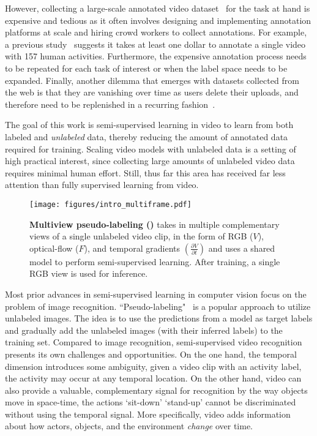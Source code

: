 \documentclass[10pt,twocolumn,letterpaper]{article}
\begin{document}
However, collecting a large-scale annotated video dataset~\cite{goyal2017something,carreira2019short} for the task at hand is expensive and tedious as it often involves designing and implementing annotation platforms at scale and hiring crowd workers to collect annotations. For example, a previous study~\cite{sigurdsson2016much} suggests it takes at least one dollar to annotate a {single} video with 157 human activities.
Furthermore, the expensive 
annotation process needs to be repeated for each task of interest or when the label space needs to be expanded. Finally, another dilemma that emerges with datasets collected from the web is that they are vanishing over time as users delete their uploads, and therefore need to be replenished in a recurring fashion~\cite{smaira2020short}. 


The  {goal} of this {work} 
is semi-supervised learning in video to learn from both labeled and \emph{unlabeled} data, {thereby reducing} the amount of annotated data required for training. Scaling video models with unlabeled data is a 
{setting of high practical interest}, since 
collecting large amounts of unlabeled video data %
requires minimal human effort. Still, {thus far} this area has received far less attention than fully supervised learning from video. %



\begin{figure}[t!]
	\centering
	\renewcommand{\tabcolsep}{0pt}
	\texttt{[image: figures/intro\_multiframe.pdf]}
	
	\caption{\textbf{Multiview  pseudo-labeling (\oursshort)} 
		takes in multiple complementary views of a single unlabeled video clip, in the form of RGB ($V$), optical-flow ($F$), and temporal gradients $(\frac{\partial V}{\partial t})$ {and uses a shared model} to perform semi-supervised learning. {After training, a single RGB view is used for inference.} }
	\label{fig:intro}
\end{figure}


Most prior advances in semi-supervised learning in computer vision focus on the problem of image  recognition. 
``Pseudo-labeling"~\cite{lee2013pseudo, yalniz2019billion, Xie_2020_CVPR, fixmatch} is a popular approach to utilize unlabeled images. The idea is  to use  the  predictions  from  a  model  as  target  labels and gradually add {the} unlabeled  {images (with their inferred labels)} to the training set. 
Compared to image recognition, {semi-supervised} video recognition presents its own challenges {and opportunities.  On the one hand,} 
the temporal dimension {introduces some} ambiguity, \ie given a video clip with an activity label, the activity may occur at any temporal location.
{On the other hand, video}
can also provide a valuable, complementary signal for recognition by the way objects move in space-time, \eg the actions `sit-down' \vs `stand-up' cannot be {discriminated} without using the temporal signal.  More specifically, {video adds} information about how actors, objects, and the %
{environment} \textit{change} over time. 
\end{document}
